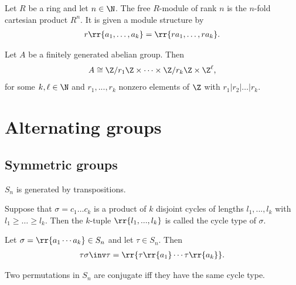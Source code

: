 \documentclass{article}
\begin{document}
\begin{definition}\label{def:free-module}
  Let $R$ be a ring and let $n\in\N$. The free $R$-module of rank $n$ is the $n$-fold
  cartesian product $R^n$. It is given a module structure by
  \begin{align*}
    r\rr{a_1,\ldots,a_k}=\rr{ra_1,\ldots,ra_k}.
  \end{align*}
\end{definition}

\begin{theorem}
  Let $A$ be a finitely generated abelian group. Then
  \begin{align*}
    A\cong \Z/r_1\Z\times\cdots\times \Z/r_k\Z\times \Z^\ell,
  \end{align*}
  for some $k,\ell\in\N$ and $r_1,...,r_k$ nonzero elements of $\Z$ with $r_1\vert r_2\vert\ldots\vert r_k$.
\end{theorem}

\section{Alternating groups}

\subsection{Symmetric groups}

\begin{lemma}
  $S_n$ is generated by transpositions.
\end{lemma}

\begin{definition}
  Suppose that $\sigma=c_1\ldots c_k$ is a product of $k$ disjoint cycles of lengths
  $l_1,...,l_k$ with $l_1\geq\ldots\geq l_k$. Then the $k$-tuple $\rr{l_1,...,l_k}$
  is called the cycle type of $\sigma$.
\end{definition}

\begin{lemma}
  Let $\sigma=\rr{a_1\cdots a_k}\in S_n$ and let $\tau\in S_n$. Then
  \begin{align*}
    \tau\sigma\inv\tau = \rr{\tau\rr{a_1}\cdots\tau\rr{a_k}}.
  \end{align*}
\end{lemma}

\begin{theorem}
  Two permutations in $S_n$ are conjugate iff they have the same cycle type.
\end{theorem}
\end{document}
